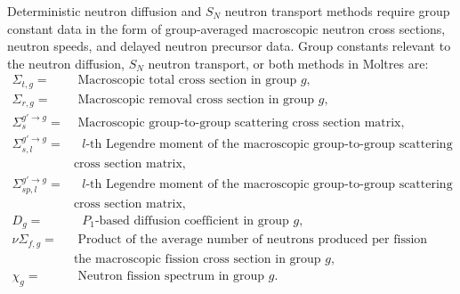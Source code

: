 Deterministic neutron diffusion and $S_N$ neutron transport methods require group constant data in
the form of group-averaged macroscopic neutron cross sections, neutron speeds, and delayed neutron
precursor data.
Group constants relevant to the neutron diffusion, $S_N$ neutron transport, or both
methods in Moltres are:
%
\begin{align*}
  \Sigma_{t,g}=& \mbox{ Macroscopic total cross section in group $g$,} &\\
  \Sigma_{r,g}=& \mbox{ Macroscopic removal cross section in group $g$,} &\\
  \Sigma_s^{g'\rightarrow g}=& \mbox{ Macroscopic group-to-group scattering cross section matrix,} &\\
  \Sigma_{s,l}^{g'\rightarrow g}=& \mbox{ $l$-th Legendre moment of the macroscopic
        group-to-group scattering} & \\
                           & \mbox{cross section matrix,} &\\
  \Sigma_{sp,l}^{g'\rightarrow g}=& \mbox{ $l$-th Legendre moment of the macroscopic
  group-to-group scattering production} & \\
                                        & \mbox{cross section matrix,} &\\
  D_g=& \mbox{ $P_1$-based diffusion coefficient in group $g$,} &\\
  \nu\Sigma_{f,g}=& \mbox{ Product of the average number of neutrons produced per fission and} &\\
                  &\mbox{the macroscopic fission cross section in group $g$,}&\\
  \chi_g=& \mbox{ Neutron fission spectrum in group $g$.}&\\
\end{align*}

